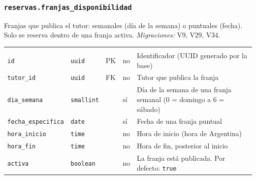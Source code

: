 \subsubsection{\texorpdfstring{\texttt{reservas.franjas\_\allowbreak{}disponibilidad}}{reservas.franjas\_disponibilidad}}\label{dd:reservas.franjas_disponibilidad}

Franjas que publica el tutor: semanales (día de la semana) o puntuales (fecha). Solo se reserva dentro de una franja activa. \emph{Migraciones:} V9, V29, V34.

{\small
\begin{xltabular}{\textwidth}{@{}>{\raggedright\arraybackslash}p{3.6cm} >{\raggedright\arraybackslash}p{2.3cm} >{\raggedright\arraybackslash}p{1cm} >{\centering\arraybackslash}p{0.85cm} L@{}}
    \toprule
     &  &  &  &  \\
    \midrule
    \endfirsthead
    \toprule
     &  &  &  &  \\
    \midrule
    \endhead
    \bottomrule
    \endfoot
    \texttt{id} & \texttt{uuid} & PK & no & Identificador (UUID generado por la base) \\
    \texttt{tutor\_\allowbreak{}id} & \texttt{uuid} & FK & no & Tutor que publica la franja \\
    \texttt{dia\_\allowbreak{}semana} & \texttt{smallint} &  & sí & Día de la semana de una franja semanal (0 = domingo a 6 = sábado) \\
    \texttt{fecha\_\allowbreak{}especifica} & \texttt{date} &  & sí & Fecha de una franja puntual \\
    \texttt{hora\_\allowbreak{}inicio} & \texttt{time} &  & no & Hora de inicio (hora de Argentina) \\
    \texttt{hora\_\allowbreak{}fin} & \texttt{time} &  & no & Hora de fin, posterior al inicio \\
    \texttt{activa} & \texttt{boolean} &  & no & La franja está publicada. Por defecto: \texttt{true} \\
\end{xltabular}
}

